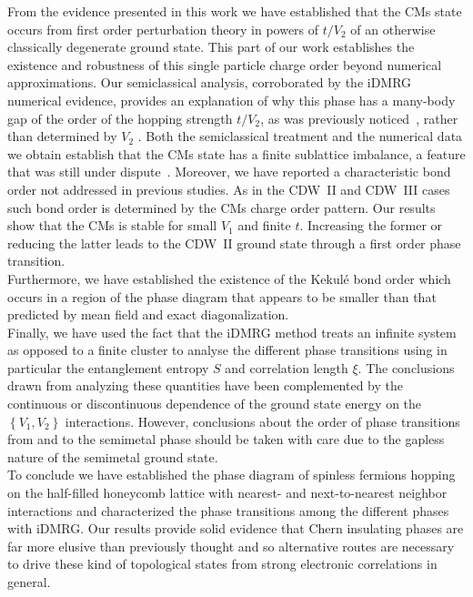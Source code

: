 \documentclass[aps,prx,10pt,twocolumn,floatfix,superscriptaddress,showpacs,numerical,footinbib]{revtex4-1}
\begin{document}
From the evidence presented in this work we have established that the CMs state occurs from first
order perturbation theory in powers of $t/V_{2}$ of an otherwise classically degenerate ground state.
%
This part of our work establishes the existence and robustness 
of this single particle charge order beyond numerical approximations.
%
Our semiclassical analysis, corroborated by the iDMRG numerical evidence,
provides an explanation of why this phase has a many-body gap of the order of the hopping strength $t/V_{2}$,
as was previously noticed~\cite{DH14,DCH14}, rather than determined by $V_{2}$ .
%
Both the semiclassical treatment and the numerical data we obtain establish that the CMs state
has a finite sublattice imbalance, a feature that was still under dispute~\cite{GCC13,DH14}.
%
Moreover, we have reported a characteristic bond order not addressed in previous studies.
%
As in the CDW~II and CDW~III cases such bond order is determined by the CMs charge order pattern.
%
Our results show that the CMs is stable for small $V_{1}$ and finite $t$.
% 
Increasing the former or reducing the latter leads to the CDW~II ground state through a first order phase transition.\\
%
Furthermore, we have established the existence of the Kekul\'{e} bond order which occurs in a region of the phase 
diagram that appears to be smaller than that predicted by mean field and exact diagonalization.\\
%
Finally, we have used the fact that the iDMRG method treats an infinite system as opposed to a finite cluster to analyse 
the different phase transitions using in particular the entanglement entropy $S$ and correlation length $\xi$.
%
The conclusions drawn from analyzing these quantities have been complemented by the continuous 
or discontinuous dependence of the ground state energy on the $\left\lbrace V_{1},V_{2}\right\rbrace$ interactions.
%
However, conclusions about the order of phase transitions from and to the semimetal phase should be taken with care due to the gapless nature of the semimetal ground state. \\
%

To conclude we have established the phase diagram of spinless fermions hopping on the half-filled honeycomb lattice
with nearest- and next-to-nearest neighbor interactions and characterized the phase transitions among the different phases with iDMRG.
%
Our results provide solid evidence that Chern insulating phases are far more elusive than previously thought and
so alternative routes are necessary to drive these kind of topological states from strong electronic correlations in general.
%
\end{document}
